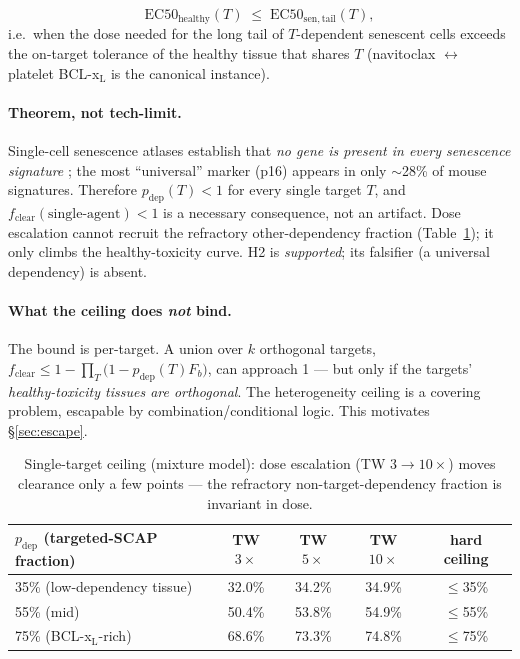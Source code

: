\documentclass[11pt,a4paper]{article}
\newcommand{\fclear}{f_{\mathrm{clear}}}
\newcommand{\pdep}{p_{\mathrm{dep}}}
\begin{document}
\begin{equation}
\mathrm{EC50}_{\mathrm{healthy}}(T) \;\le\; \mathrm{EC50}_{\mathrm{sen,tail}}(T),
\label{eq:window-close}
\end{equation}
i.e.\ when the dose needed for the long tail of $T$-dependent senescent cells
exceeds the on-target tolerance of the healthy tissue that shares $T$
(navitoclax $\leftrightarrow$ platelet BCL-x$_{\mathrm L}$ is the canonical
instance).

\paragraph{Theorem, not tech-limit.}
Single-cell senescence atlases establish that \emph{no gene is present in every
senescence signature} \citep{senepy2025,senmayo2022}; the most ``universal''
marker (p16) appears in only $\sim$28\% of mouse signatures. Therefore
$\pdep(T)<1$ for every single target $T$, and
$\fclear(\text{single-agent})<1$ is a necessary consequence, not an artifact.
Dose escalation cannot recruit the refractory other-dependency fraction
(Table~\ref{tab:ceiling}); it only climbs the healthy-toxicity curve. H2 is
\emph{supported}; its falsifier (a universal dependency) is absent.

\paragraph{What the ceiling does \emph{not} bind.}
The bound is per-target. A union over $k$ orthogonal targets,
$\fclear \le 1-\prod_T\!\big(1-\pdep(T)F_b\big)$, can approach 1 --- but only if
the targets' \emph{healthy-toxicity tissues are orthogonal}. The heterogeneity
ceiling is a covering problem, escapable by combination/conditional logic. This
motivates \S\ref{sec:escape}.

\begin{table}[t]
\centering
\caption{Single-target ceiling (mixture model): dose escalation (TW $3\to10\times$)
moves clearance only a few points --- the refractory non-target-dependency
fraction is invariant in dose.}
\label{tab:ceiling}
\small
\begin{tabular}{@{}lcccc@{}}
\toprule
$\pdep$ (targeted-SCAP fraction) & TW $3\times$ & TW $5\times$ & TW $10\times$ & hard ceiling \\
\midrule
35\% (low-dependency tissue) & 32.0\% & 34.2\% & 34.9\% & $\le$35\% \\
55\% (mid) & 50.4\% & 53.8\% & 54.9\% & $\le$55\% \\
75\% (BCL-x$_{\mathrm L}$-rich) & 68.6\% & 73.3\% & 74.8\% & $\le$75\% \\
\bottomrule
\end{tabular}
\end{table}
\end{document}

